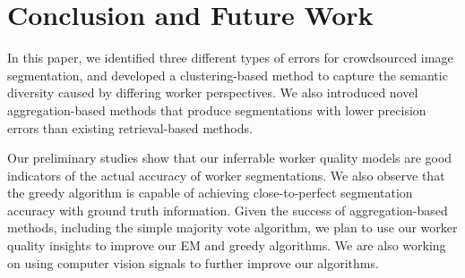 \section{Conclusion and Future Work}
In this paper, we identified three different types of errors for crowdsourced image segmentation, and developed a clustering-based method to capture the semantic diversity caused by differing worker perspectives. We also introduced novel aggregation-based methods that produce segmentations with lower precision errors than existing retrieval-based methods.
\par Our preliminary studies show that our inferrable worker quality models are good indicators of the actual accuracy of worker segmentations. We also observe that the greedy algorithm is capable of achieving close-to-perfect segmentation accuracy with ground truth information. 
Given the success of aggregation-based methods, including the simple majority vote algorithm, we plan to use our worker quality insights to improve our EM and greedy algorithms. 
We are also working on using computer vision signals to further improve our algorithms.
